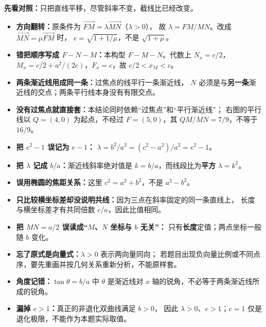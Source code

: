 \clearpage
\begin{trapbox}
\begin{center}\end{center}
\textbf{先看对照：}只把直线平移，尽管斜率不变，截线比已经改变。
\begin{itemize}
\item \textbf{方向翻转：}原条件为
$\overrightarrow{FM}=\lambda\overrightarrow{MN}$（$\lambda>0$），
故 $\lambda=FM/MN$。改成 $\overrightarrow{MN}=\mu\overrightarrow{FM}$ 时，
$e=\sqrt{1+1/\mu}$，不是 $\sqrt{1+\mu}$。
\item \textbf{错把顺序写成 $F-N-M$：}本构型 $F-M-N$。代数上
$N_x=c/2$，$M_x=c/2+a^2/(2c)$，$F_x=c$，故 $c/2<x_M<c$。
\item \textbf{两条渐近线用成同一条：}过焦点的线平行一条渐近线，
$N$ 必须是与\textbf{另一条}渐近线的交点；两条平行线本身没有有限交点。
\item \textbf{没有过焦点就直接套：}本结论同时依赖“过焦点”和“平行渐近线”；
右图的平行线以 $Q=(4,0)$ 为起点，不经过 $F=(5,0)$，其 $QM/MN=7/9$，不等于 $16/9$。
\item \textbf{把 $e^2-1$ 误记为 $e-1$：}
$\lambda=b^2/a^2=(c^2-a^2)/a^2=\boxed{e^2-1}$。
\item \textbf{把 $\lambda$ 记成 $b/a$：}渐近线斜率绝对值是
$k=b/a$，而线段比为\textbf{平方} $\lambda=k^2$。
\item \textbf{误用椭圆的焦距关系：}这里
$\boxed{c^2=a^2+b^2}$，不是 $a^2-b^2$。
\item \textbf{只比较横坐标差却没说明共线：}因为三点在斜率固定的同一条直线上，
长度与横坐标差才有共同倍数 $c/a$，因此比值相同。
\item \textbf{把 $MN=a/2$ 误读成“$M$、$N$ 坐标与 $b$ 无关”：}
只有\textbf{长度}定值；两点坐标一般随 $b$ 变化。
\item \textbf{忘了原式是向量式：}$\lambda>0$ 表示两向量同向；
若题目出现负向量比例或不同点序，要先重画并按几何关系重新分析，不能原样套。
\item \textbf{角度记错：}$\tan\theta=b/a$ 中
$\theta$ 是渐近线对 $x$ 轴的锐角，不必等于两条渐近线所成的锐角。
\item \textbf{漏掉 $e>1$：}真正的非退化双曲线满足 $b>0$，
因此 $\lambda>0$、$e>1$；$e=1$ 仅是退化极限，不能作为本题实际取值。
\end{itemize}
\end{trapbox}
